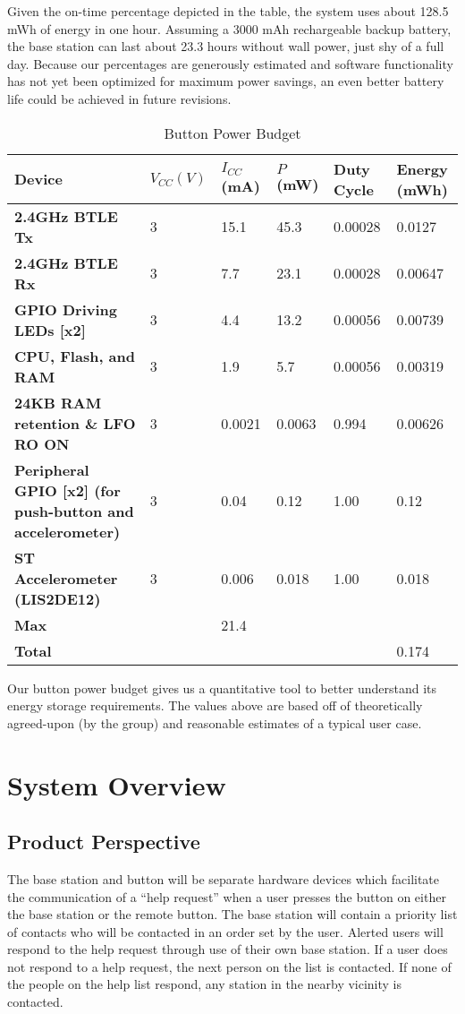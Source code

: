 \documentclass[journal,compsoc]{IEEEtran}
\begin{document}
\noindent Given the on-time percentage depicted in the table, the system uses about 128.5 mWh of energy in one hour. Assuming a 3000 mAh rechargeable backup battery, the base station can last about 23.3 hours without wall power, just shy of a full day. Because our percentages are generously estimated and software functionality has not yet been optimized for maximum power savings, an even better battery life could be achieved in future revisions.

\begin{table*}[t]
  \centering
  \begin{tabular}{>{\bfseries}l|l l l l l}
    Device & $V_{CC} (V)$ & $I_{CC}$ (mA) & $P$ (mW) & Duty Cycle & Energy (mWh) \\
    \hline
    2.4GHz BTLE Tx & 3 & 15.1 & 45.3 & 0.00028 & 0.0127 \\
    2.4GHz BTLE Rx & 3 & 7.7 & 23.1 & 0.00028 & 0.00647 \\
    GPIO Driving LEDs [x2] & 3 & 4.4 & 13.2 & 0.00056 & 0.00739 \\
    CPU, Flash, and RAM & 3 & 1.9 & 5.7 & 0.00056 & 0.00319 \\
    24KB RAM retention \& LFO RO ON & 3 & 0.0021 & 0.0063 & 0.994 & 0.00626 \\
    Peripheral GPIO [x2] (for push-button and accelerometer) & 3 & 0.04 & 0.12 & 1.00 & 0.12 \\
    ST Accelerometer (LIS2DE12) & 3 & 0.006 & 0.018 & 1.00 & 0.018 \\
    \hline
    Max & & 21.4 & & & \\
    Total & & & & & 0.174
  \end{tabular}
  \caption{Button Power Budget}
\end{table*}

\noindent Our button power budget gives us a quantitative tool to better understand its energy storage requirements.  The values above are based off of theoretically agreed-upon (by the group) and reasonable estimates of a typical user case.

\section{System Overview}

\subsection{Product Perspective}
The base station and button will be separate hardware devices which facilitate the communication of a “help request” when a user presses the button on either the base station or the remote button. The base station will contain a priority list of contacts who will be contacted in an order set by the user. Alerted users will respond to the help request through use of their own base station.  If a user does not respond to a help request, the next person on the list is contacted. If none of the people on the help list respond, any station in the nearby vicinity is contacted.
\end{document}
